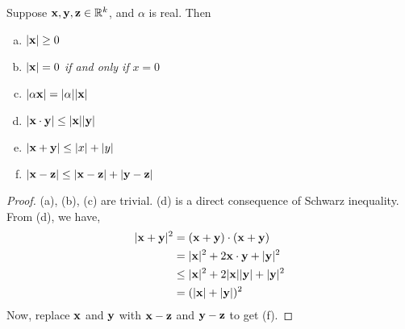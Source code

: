 \begin{thm}
	Suppose ${\bf x, y, z} \in \mathbb{R}^k$, and $\alpha$ is real. Then
	\begin{enumerate}[a)]
		\item $|{\bf x}| \geq 0$
		\item $|{\bf x}| = 0$ {\it if and only if } $x = 0$
		\item $|\alpha {\bf x}| = |\alpha| |{\bf x}|$
		\item $|{\bf x \cdot y}| \leq |{\bf x}||{\bf y}|$
		\item $|{\bf x + y}| \leq |x| + |y|$
		\item $|{\bf x - z}| \leq |{\bf x - z}| + |{\bf y - z}|$
	\end{enumerate}

	\begin{proof}
		(a), (b), (c) are trivial. (d) is a direct consequence of Schwarz inequality.
		From (d), we have,
		\begin{align*}
			|{\bf x + y}|^2 & = ({\bf x + y}) \cdot ({\bf x + y}) \\
				& = |{\bf x}|^2 + 2 {\bf x} \cdot {\bf y} + |{\bf y}|^2 \\
				& \leq |{\bf x}|^2 + 2|{\bf x}||{\bf y}| + |{\bf y}|^2 \\
				& = (|{\bf x}| + |{\bf y}|)^2
		\end{align*}
		Now, replace ${\bf x}$ and ${\bf y}$ with ${\bf x - z}$ and ${\bf y - z}$ to get (f).
	\end{proof}

\end{thm}
